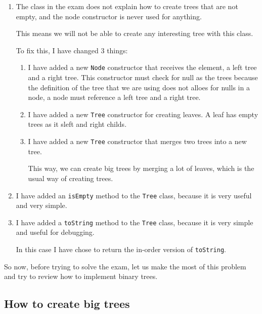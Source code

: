 \documentclass[a4paper, 9pt]{extarticle}
\begin{document}
\begin{enumerate}

  \item The class in the exam does not explain how to create trees that are not
    empty, and the node constructor is never used for anything.

    This means we will not be able to create any interesting tree with this class.

    To fix this, I have changed 3 things:

    \begin{enumerate}

      \item I have added a new \texttt{Node} constructor that receives the
        element, a left tree and a right tree. This constructor must check for
        null as the trees because the definition of the tree that we are using
        does not alloes for nulls in a node, a node must reference a left tree
        and a right tree.

      \item I have added a new \texttt{Tree} constructor for creating leaves. A
        leaf has empty trees as it sleft and right childs.

      \item I have added a new \texttt{Tree} constructor that merges two trees into a new tree.

        This way, we can create big trees by merging a lot of leaves, which is
        the usual way of creating trees.

    \end{enumerate}

  \item I have added an \texttt{isEmpty} method to the \texttt{Tree} class,
    because it is very useful and very simple.

  \item I have added a \texttt{toString} method to the \texttt{Tree} class,
    because it is very simple and useful for debugging.

    In this case I have chose to return the in-order version of \texttt{toString}.

\end{enumerate}


So now, before trying to solve the exam, let us make the most of this problem
and try to review how to implement binary trees.

\newpage
\subsection{How to create big trees}
\end{document}
